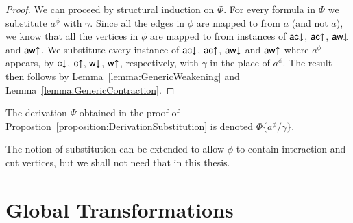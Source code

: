\begin{proof}
We can proceed by structural induction on $\Phi$. For every formula in $\Phi$ we substitute $a^\phi$ with $\gamma$. Since all the edges in $\phi$ are mapped to from $a$ (and not $\bar a$), we know that all the vertices in $\phi$ are mapped to from instances of ${{\mathsf{ac}}{\downarrow}}$, ${{\mathsf{ac}}{\uparrow}}$, ${{\mathsf{aw}}{\downarrow}}$ and ${{\mathsf{aw}}{\uparrow}}$. We substitute every instance of ${{\mathsf{ac}}{\downarrow}}$, ${{\mathsf{ac}}{\uparrow}}$, ${{\mathsf{aw}}{\downarrow}}$ and ${{\mathsf{aw}}{\uparrow}}$ where $a^\phi$ appears, by ${\mathsf{c}{\downarrow}}$, ${\mathsf{c}{\uparrow}}$, ${\mathsf{w}{\downarrow}}$, ${\mathsf{w}{\uparrow}}$, respectively, with $\gamma$ in the place of $a^\phi$. The result then follows by Lemma~\vref{lemma:GenericWeakening} and Lemma~\vref{lemma:GenericContraction}.
\end{proof}



\begin{notation}
The derivation $\Psi$ obtained in the proof of Propostion~\vref{proposition:DerivationSubstitution} is denoted $\Phi\{a^\phi/\gamma\}$.
\end{notation}

\begin{remark}
The notion of substitution can be extended to allow $\phi$ to contain interaction and cut vertices, but we shall not need that in this thesis.
\end{remark}

\section{Global Transformations}\label{section:GlobalTransformations}




